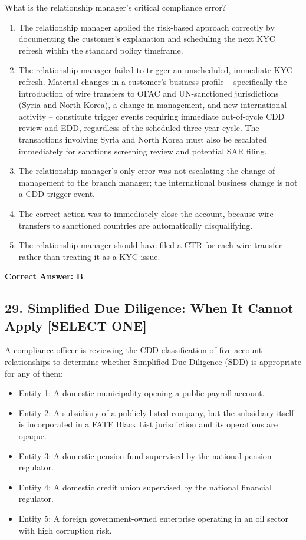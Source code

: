 \documentclass[11pt,a4paper]{article}
\begin{document}
	What is the relationship manager's critical compliance error?
	
	\begin{enumerate}[label=\Alph*.]
		\item The relationship manager applied the risk-based approach correctly by documenting the customer's explanation and scheduling the next KYC refresh within the standard policy timeframe.
		\item The relationship manager failed to trigger an unscheduled, immediate KYC refresh. Material changes in a customer's business profile -- specifically the introduction of wire transfers to OFAC and UN-sanctioned jurisdictions (Syria and North Korea), a change in management, and new international activity -- constitute trigger events requiring immediate out-of-cycle CDD review and EDD, regardless of the scheduled three-year cycle. The transactions involving Syria and North Korea must also be escalated immediately for sanctions screening review and potential SAR filing.
		\item The relationship manager's only error was not escalating the change of management to the branch manager; the international business change is not a CDD trigger event.
		\item The correct action was to immediately close the account, because wire transfers to sanctioned countries are automatically disqualifying.
		\item The relationship manager should have filed a CTR for each wire transfer rather than treating it as a KYC issue.
	\end{enumerate}
	\textbf{Correct Answer: B}
	
	\subsection{29. Simplified Due Diligence: When It Cannot Apply \textnormal{[SELECT ONE]}}
	
	A compliance officer is reviewing the CDD classification of five account relationships to determine whether Simplified Due Diligence (SDD) is appropriate for any of them:
	
	\begin{itemize}
		\item Entity 1: A domestic municipality opening a public payroll account.
		\item Entity 2: A subsidiary of a publicly listed company, but the subsidiary itself is incorporated in a FATF Black List jurisdiction and its operations are opaque.
		\item Entity 3: A domestic pension fund supervised by the national pension regulator.
		\item Entity 4: A domestic credit union supervised by the national financial regulator.
		\item Entity 5: A foreign government-owned enterprise operating in an oil sector with high corruption risk.
	\end{itemize}
	
\end{document}
